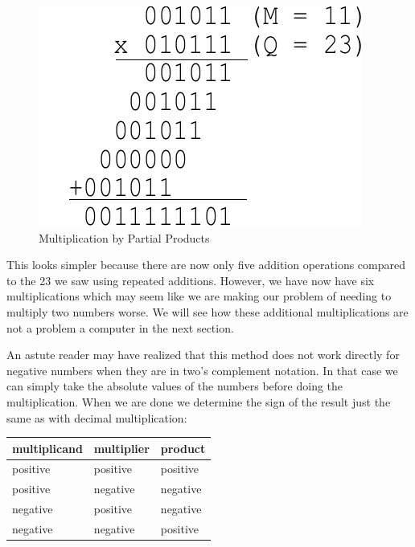 \documentclass{article}
\begin{document}
\begin{figure}[h]
\centering
\includegraphics[scale=0.7]{saam3.pdf}
\caption{Multiplication by Partial Products}
\end{figure}

This looks simpler because there are now only five addition operations compared to the 23 we saw using repeated additions.
However, we have now have six multiplications which may seem like we are making our problem of needing to multiply two numbers worse.
We will see how these additional multiplications are not a problem a computer in the next section.


An astute reader may have realized that this method does not work directly for negative numbers when they are in two's complement notation.
In that case we can simply take the absolute values of the numbers before doing the multiplication.
When we are done we determine the sign of the result just the same as with decimal multiplication:

\begin{center}
    \begin{tabular}{| l | l | l |}
        \hline
        multiplicand & multiplier & product \\
        \hline
        positive & positive & positive \\
        positive & negative & negative \\
        negative & positive & negative \\
        negative & negative & positive \\
        \hline
    \end{tabular}
\end{center}
\end{document}

